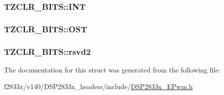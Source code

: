 \subsubsection[{I\+N\+T}]{ T\+Z\+C\+L\+R\+\_\+\+B\+I\+T\+S\+::\+I\+N\+T}\label{struct_t_z_c_l_r___b_i_t_s_a66629d4927224c2e5ba60a8bb8c6398b}
\hypertarget{struct_t_z_c_l_r___b_i_t_s_ac62fe9e0268c55533748b592b1895aa1}{}
\subsubsection[{O\+S\+T}]{ T\+Z\+C\+L\+R\+\_\+\+B\+I\+T\+S\+::\+O\+S\+T}\label{struct_t_z_c_l_r___b_i_t_s_ac62fe9e0268c55533748b592b1895aa1}
\hypertarget{struct_t_z_c_l_r___b_i_t_s_a5d5275ffe47f3553720648c9dce9dacf}{}
\subsubsection[{rsvd2}]{ T\+Z\+C\+L\+R\+\_\+\+B\+I\+T\+S\+::rsvd2}\label{struct_t_z_c_l_r___b_i_t_s_a5d5275ffe47f3553720648c9dce9dacf}


The documentation for this struct was generated from the following file\+:\begin{DoxyCompactItemize}
\item 
f2833x/v140/\+D\+S\+P2833x\+\_\+headers/include/\hyperlink{_d_s_p2833x___e_pwm_8h}{D\+S\+P2833x\+\_\+\+E\+Pwm.\+h}\end{DoxyCompactItemize}
